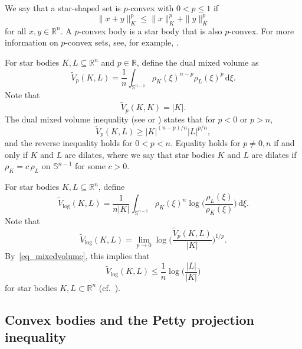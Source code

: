 \documentclass{amsart}
\newcommand{\snvtex}{{\mathbb S}^{n-1}}
\newcommand{\dVlog}{\tilde V_{\log}}
\newcommand{\dvtex}{\,\mathrm{d}}
\newcommand{\vol}[1]{ \vert #1\vert}
\begin{document}
We say that a star-shaped set is $p$-convex with $0< p \leq 1$ if
%
\begin{equation*}
\|x+y\|_{K}^{p} \leq \|x\|_{K}^{p} + \|y\|_{K}^{p}
\end{equation*}
%
for all $x,y \in \mathbb R^{n}$. A $p$-convex body is a star body that
is also $p$-convex. For more information on $p$-convex sets, see, for example,
\cite{KPR}.

For star bodies $K,L \subseteq \mathbb R^{n}$ and $p \in \mathbb R$, define
the dual mixed volume as
%
\begin{equation*}
\tilde V_{p}(K,L) = \frac {1}{n} \int _{\snvtex} \rho _{K}(\xi )^{n-p}
\rho _{L}(\xi )^{p} \dvtex \xi .
\end{equation*}
%
Note that
%
\begin{equation*}
\tilde V_{p}(K,K) = \vol{K}.
\end{equation*}
%
The dual mixed volume inequality (see
\cite[Section~9.3]{Schneider:CB2} or \cite[B.29]{Gardner}) states that
for $p<0$ or $p>n$,
%
\begin{equation}
\label{eq_mixedvolume}
\tilde V_{p}(K,L) \geq \vol{K}^{({n-p})/n} \vol{L}^{ p/n},
\end{equation}
%
and the reverse inequality holds for $0<p<n$. Equality holds for
$p \neq 0,n$ if and only if $K$ and $L$ are dilates, where we say that
star bodies $K$ and $L$ are dilates if $\rho _{K}=c\,\rho _{L}$ on
$\snvtex $ for some $c>0$.

For star bodies $K,L \subseteq \mathbb R^{n}$, define
%
\begin{equation}
\label{eq_dVlog}
\dVlog (K,L) = \frac {1}{n\vol{K}} \int _{\snvtex} \rho _{K}(\xi )^{n}
\log \Big(\frac{\rho _{L}(\xi )}{\rho _{K}(\xi )}\Big) \dvtex \xi .
\end{equation}
%
Note that
%
\begin{equation*}
\dVlog (K,L) = \lim _{p\to 0} \log \Big(
\frac{\tilde V_{p}(K,L)}{\vol{K}}\Big)^{1/p}.
\end{equation*}
%
By~\eqref{eq_mixedvolume}, this implies that
%
\begin{equation}
\label{eq_mixedvolume_log}
\dVlog (K,L) \leq \frac {1}{n}\log \Big(\frac{\vol{L}}{\vol{K}}\Big)
\end{equation}
%
for star bodies $K,L \subset \mathbb R^{n}$ (cf.\ \cite{GardnerHugWeilYe}).

\subsection{Convex bodies and the Petty projection inequality}
\end{document}
